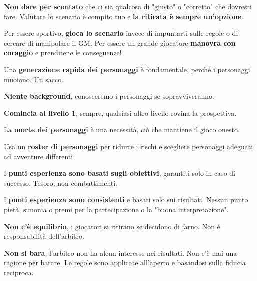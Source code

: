 \textbf{Non dare per scontato} che ci sia qualcosa di "giusto" o "corretto" che dovresti fare. Valutare lo scenario è compito tuo e \textbf{la ritirata è sempre un'opzione}.

Per essere sportivo, \textbf{gioca lo scenario} invece di impuntarti sulle regole o di cercare di manipolare il GM. Per essere un grande giocatore \textbf{manovra con coraggio} e prenditene le conseguenze!


Una \textbf{generazione rapida dei personaggi} è fondamentale, perché i personaggi muoiono. Un sacco.

\textbf{Niente background}, conosceremo i personaggi se sopravviveranno.

\textbf{Comincia al livello 1}, sempre, qualsiasi altro livello rovina la prospettiva.

La \textbf{morte dei personaggi} è una necessità, ciò che mantiene il gioco onesto.

Usa un \textbf{roster di personaggi} per ridurre i rischi e scegliere personaggi adeguati ad avventure differenti.

I \textbf{punti esperienza sono basati sugli obiettivi}, garantiti solo in caso di successo. Tesoro, non combattimenti.

I \textbf{punti esperienza sono consistenti} e basati solo sui risultati. Nessun punto pietà, simonia o premi per la partecipazione o la "buona interpretazione".

\textbf{Non c'è equilibrio}, i giocatori si ritirano se decidono di farno. Non è responsabilità dell'arbitro.

\textbf{Non si bara}; l'arbitro non ha alcun interesse nei risultati. Non c'è mai una ragione per barare. Le regole sono applicate all'aperto e basandosi sulla fiducia reciproca.
